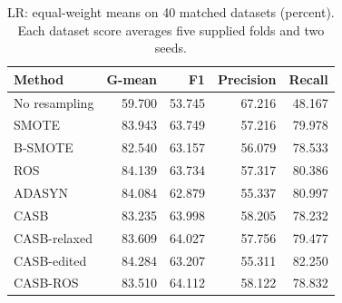 \begin{table}[pos=!htbp]
\centering\small
\caption{LR: equal-weight means on 40 matched datasets (percent). Each dataset score averages five supplied folds and two seeds.}\label{tab:scores_lr}
\begin{tabular}{lrrrr}\toprule
Method & G-mean & F1 & Precision & Recall \\
\midrule
No resampling & 59.700 & 53.745 & 67.216 & 48.167 \\
SMOTE & 83.943 & 63.749 & 57.216 & 79.978 \\
B-SMOTE & 82.540 & 63.157 & 56.079 & 78.533 \\
ROS & 84.139 & 63.734 & 57.317 & 80.386 \\
ADASYN & 84.084 & 62.879 & 55.337 & 80.997 \\
CASB & 83.235 & 63.998 & 58.205 & 78.232 \\
CASB-relaxed & 83.609 & 64.027 & 57.756 & 79.477 \\
CASB-edited & 84.284 & 63.207 & 55.311 & 82.250 \\
CASB-ROS & 83.510 & 64.112 & 58.122 & 78.832 \\
\bottomrule\end{tabular}
\end{table}
